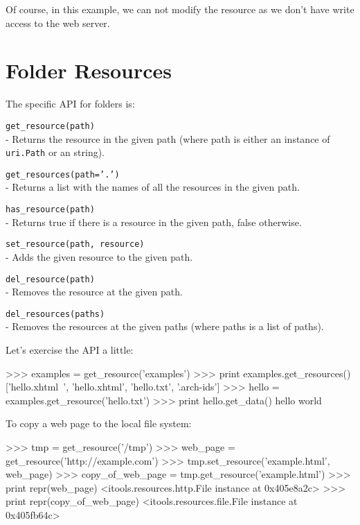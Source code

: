 Of course, in this example, we can not modify the resource as we don't have
write access to the web server.


\section{Folder Resources}

The specific API for folders is:

\begin{api}
  {\tt get\_resource(path)}\\
  - Returns the resource in the given path (where path is either an instance
    of {\tt uri.Path} or an string).

  {\tt get\_resources(path='.')}\\
  - Returns a list with the names of all the resources in the given path.

  {\tt has\_resource(path)}\\
  - Returns true if there is a resource in the given path, false otherwise.

  {\tt set\_resource(path, resource)}\\
  - Adds the given resource to the given path.

  {\tt del\_resource(path)}\\
  - Removes the resource at the given path.

  {\tt del\_resources(paths)}\\
  - Removes the resources at the given paths (where paths is a list of paths).
\end{api}

Let's exercise the API a little:

\begin{code}
    >>> examples = get_resource('examples')
    >>> print examples.get_resources()
    ['hello.xhtml~', 'hello.xhtml', 'hello.txt', '.arch-ids']
    >>> hello = examples.get_resource('hello.txt')
    >>> print hello.get_data()
    hello world
\end{code}

To copy a web page to the local file system:

\begin{code}
    >>> tmp = get_resource('/tmp')
    >>> web_page = get_resource('http://example.com')
    >>> tmp.set_resource('example.html', web_page)
    >>> copy_of_web_page = tmp.get_resource('example.html')
    >>> print repr(web_page)
    <itools.resources.http.File instance at 0x405e8a2c>
    >>> print repr(copy_of_web_page)
    <itools.resources.file.File instance at 0x405fb64c>
\end{code}

